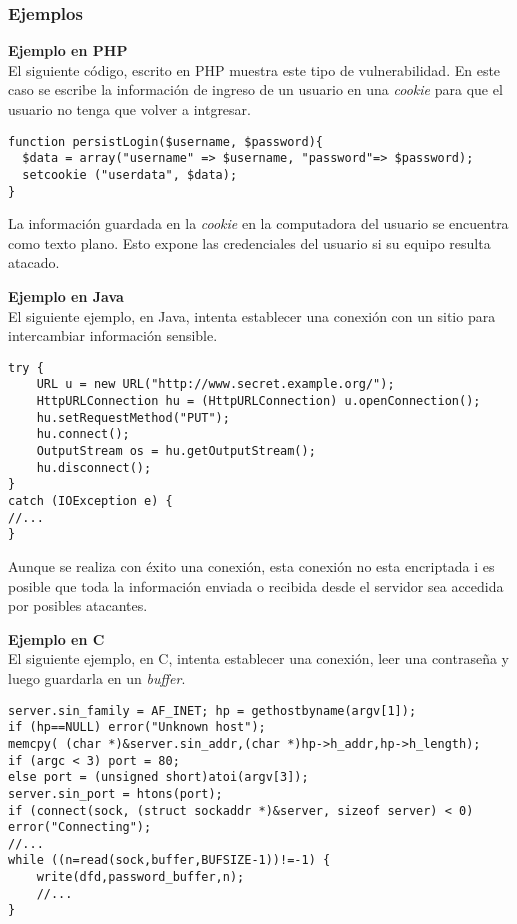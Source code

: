 \subsubsection{Ejemplos}

\noindent \textbf{Ejemplo en PHP}\\

El siguiente código, escrito en PHP muestra este tipo de vulnerabilidad.
En este caso se escribe la información de ingreso de un usuario en una \textit{cookie} para que el usuario no tenga que volver a intgresar.
\begin{Verbatim}[frame=single]
function persistLogin($username, $password){
  $data = array("username" => $username, "password"=> $password);
  setcookie ("userdata", $data);
}
\end{Verbatim}

La información guardada en la \textit{cookie} en la computadora del usuario se encuentra como texto plano.
Esto expone las credenciales del usuario si su equipo resulta atacado. 

\noindent \textbf{Ejemplo en Java}\\

El siguiente ejemplo, en Java, intenta establecer una conexión con un sitio para intercambiar información sensible.

\begin{Verbatim}[frame=single]
try {
	URL u = new URL("http://www.secret.example.org/");
	HttpURLConnection hu = (HttpURLConnection) u.openConnection();
	hu.setRequestMethod("PUT");
	hu.connect();
	OutputStream os = hu.getOutputStream();
	hu.disconnect();
}
catch (IOException e) {
//...
}
\end{Verbatim}

Aunque se realiza con éxito una conexión, esta conexión no esta encriptada i es posible que toda la información enviada o recibida desde el servidor sea accedida por posibles atacantes.

\noindent \textbf{Ejemplo en C}\\

El siguiente ejemplo, en C, intenta establecer una conexión, leer una contraseña y luego guardarla en un \textit{buffer}.

\begin{Verbatim}[frame=single]
server.sin_family = AF_INET; hp = gethostbyname(argv[1]);
if (hp==NULL) error("Unknown host");
memcpy( (char *)&server.sin_addr,(char *)hp->h_addr,hp->h_length);
if (argc < 3) port = 80;
else port = (unsigned short)atoi(argv[3]);
server.sin_port = htons(port);
if (connect(sock, (struct sockaddr *)&server, sizeof server) < 0) error("Connecting");
//...
while ((n=read(sock,buffer,BUFSIZE-1))!=-1) {
	write(dfd,password_buffer,n);
	//...
}
\end{Verbatim}

